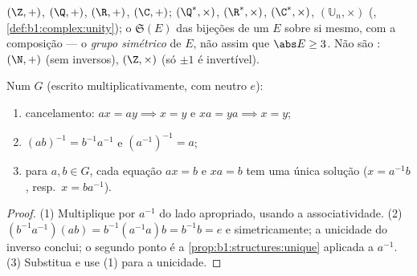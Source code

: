 \begin{example}\label{ex:b1:structures:groups}
$(\Z, +)$, $(\Q, +)$, $(\R, +)$, $(\C, +)$; $(\Q^*, \times)$,
$(\R^*, \times)$, $(\C^*, \times)$, $(\mathbb{U}_n, \times)$ (, \cref{def:b1:complex:unity}); o  $\mathfrak{S}(E)$ das
bijeções de um  $E$ sobre si mesmo, com a composição --- o
\emph{grupo simétrico} de $E$, não  assim
que $\abs E \geq 3$. Não são : $(\N, +)$ (sem inversos),
$(\Z, \times)$ (só $\pm 1$ é invertível).
\end{example}

\begin{proposition}\label{prop:b1:structures:rules}
Num  $G$ (escrito multiplicativamente, com neutro $e$):
\begin{enumerate}
  \item cancelamento: $ax = ay \implies x = y$ e $xa = ya \implies
        x = y$;
  \item $(ab)^{-1} = b^{-1} a^{-1}$ e $(a^{-1})^{-1} = a$;
  \item para $a, b \in G$, cada equação $ax = b$ e $xa = b$ tem uma
        única solução ($x = a^{-1}b$, resp.\ $x = b a^{-1}$).
\end{enumerate}
\end{proposition}

\begin{proof}
(1) Multiplique por $a^{-1}$ do lado apropriado, usando a
associatividade. (2) $(b^{-1}a^{-1})(ab) = b^{-1}(a^{-1}a)b = b^{-1}b =
e$ e simetricamente; a unicidade do inverso conclui; o segundo
ponto é a \cref{prop:b1:structures:unique} aplicada a $a^{-1}$. (3)
Substitua e use (1) para a unicidade.
\end{proof}

